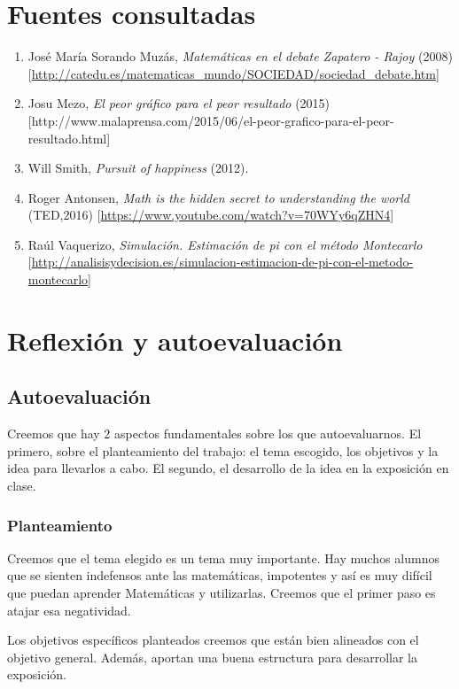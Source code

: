 \newpage
\section{Fuentes consultadas}

\begin{enumerate}
\item José María Sorando Muzás, \textit{Matemáticas en el debate Zapatero - Rajoy} (2008) [\url{http://catedu.es/matematicas_mundo/SOCIEDAD/sociedad_debate.htm}]
\item Josu Mezo, \textit{El peor gráfico para el peor resultado} (2015) [http://www.malaprensa.com/2015/06/el-peor-grafico-para-el-peor-resultado.html]
\item Will Smith, \textit{Pursuit of happiness} (2012).
\item Roger Antonsen, \textit{Math is the hidden secret to understanding the world } (TED,2016) [\url{https://www.youtube.com/watch?v=70WYy6qZHN4}]
\item Raúl Vaquerizo, \textit{Simulación. Estimación de pi con el método Montecarlo } [\url{http://analisisydecision.es/simulacion-estimacion-de-pi-con-el-metodo-montecarlo}]
\end{enumerate}

\section{Reflexión y autoevaluación}


\subsection{Autoevaluación}

Creemos que hay 2 aspectos fundamentales sobre los que autoevaluarnos. 
%
El primero, sobre el planteamiento del trabajo: el tema escogido, los objetivos y la idea para llevarlos a cabo.
%
El segundo, el desarrollo de la idea en la exposición en clase.

\subsubsection{Planteamiento}

Creemos que el tema elegido es un tema muy importante.
%
Hay muchos alumnos que se sienten indefensos ante las matemáticas, impotentes y así es muy difícil que puedan aprender Matemáticas y utilizarlas. Creemos que el primer paso es atajar esa negatividad.

Los objetivos específicos planteados creemos que están bien alineados con el objetivo general. 
%
Además, aportan una buena estructura para desarrollar la exposición.

